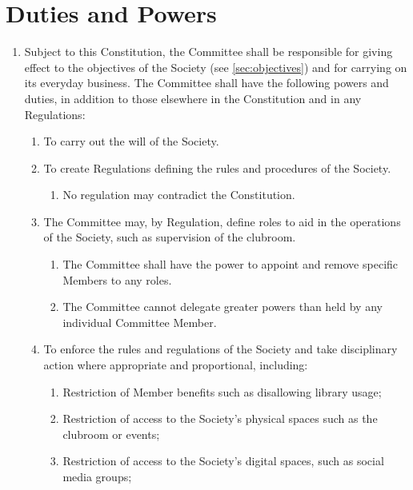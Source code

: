 \documentclass[a4paper]{article}
\begin{document}
\section{Duties and Powers} \label{sec:duties}
\begin{enumerate}
    \item Subject to this Constitution, the Committee shall be responsible for giving effect to the objectives of the Society (see \cref{sec:objectives}) and for carrying on its everyday business. The Committee shall have the following powers and duties, in addition to those elsewhere in the Constitution and in any Regulations:
          \begin{enumerate}
              \item To carry out the will of the Society.
              \item To create Regulations defining the rules and procedures of the Society.
                    \begin{enumerate}
                        \item No regulation may contradict the Constitution.
                    \end{enumerate}
              \item The Committee may, by Regulation, define roles to aid in the operations of the Society, such as supervision of the clubroom.
                    \begin{enumerate}
                        \item The Committee shall have the power to appoint and remove specific Members to any roles.
                        \item The Committee cannot delegate greater powers than held by any individual Committee Member.
                    \end{enumerate}
              \item \label{item:committee_enforce_rules} To enforce the rules and regulations of the Society and take disciplinary action where appropriate and proportional, including:
                    \begin{enumerate}
                        \item Restriction of Member benefits such as disallowing library usage;
                        \item Restriction of access to the Society’s physical spaces such as the clubroom or events;
                        \item Restriction of access to the Society’s digital spaces, such as social media groups;

\end{enumerate}
\end{enumerate}
\end{enumerate}
\end{document}
